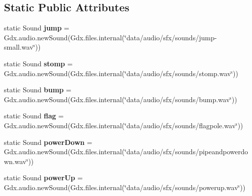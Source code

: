 \subsection*{Static Public Attributes}
\begin{DoxyCompactItemize}
\item 
\mbox{\label{classnl_1_1arjanfrans_1_1mario_1_1audio_1_1Audio_ac745382e99ecaa230981b95922a343b0}} 
static Sound {\bfseries jump} = Gdx.\+audio.\+new\+Sound(Gdx.\+files.\+internal(\char`\"{}data/audio/sfx/sounds/jump-\/small.\+wav\char`\"{}))
\item 
\mbox{\label{classnl_1_1arjanfrans_1_1mario_1_1audio_1_1Audio_ad1c5e4b12abbe4a7ac54e604a66ca938}} 
static Sound {\bfseries stomp} = Gdx.\+audio.\+new\+Sound(Gdx.\+files.\+internal(\char`\"{}data/audio/sfx/sounds/stomp.\+wav\char`\"{}))
\item 
\mbox{\label{classnl_1_1arjanfrans_1_1mario_1_1audio_1_1Audio_aaad87b915c08807251c2499acfee7aea}} 
static Sound {\bfseries bump} = Gdx.\+audio.\+new\+Sound(Gdx.\+files.\+internal(\char`\"{}data/audio/sfx/sounds/bump.\+wav\char`\"{}))
\item 
\mbox{\label{classnl_1_1arjanfrans_1_1mario_1_1audio_1_1Audio_a9e01185b0b590c94ee5a7f688a4089ee}} 
static Sound {\bfseries flag} = Gdx.\+audio.\+new\+Sound(Gdx.\+files.\+internal(\char`\"{}data/audio/sfx/sounds/flagpole.\+wav\char`\"{}))
\item 
\mbox{\label{classnl_1_1arjanfrans_1_1mario_1_1audio_1_1Audio_a018223f086974df36bd1cb093311bf24}} 
static Sound {\bfseries power\+Down} = Gdx.\+audio.\+new\+Sound(Gdx.\+files.\+internal(\char`\"{}data/audio/sfx/sounds/pipeandpowerdown.\+wav\char`\"{}))
\item 
\mbox{\label{classnl_1_1arjanfrans_1_1mario_1_1audio_1_1Audio_adfd739566cd06b276841f91012724dc6}} 
static Sound {\bfseries power\+Up} = Gdx.\+audio.\+new\+Sound(Gdx.\+files.\+internal(\char`\"{}data/audio/sfx/sounds/powerup.\+wav\char`\"{}))
\item 

\end{DoxyCompactItemize}

